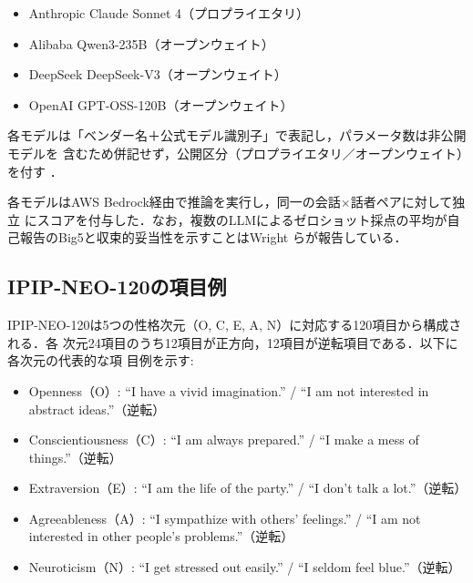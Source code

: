 \documentclass[dvipdfmx,11pt,a4paper]{bxjsarticle}
\renewcommand{\_}{\paperorigunderscore\allowbreak}%
\begin{document}

\begin{itemize}
  \item Anthropic Claude Sonnet 4（プロプライエタリ）
  \item Alibaba Qwen3-235B（オープンウェイト）
  \item DeepSeek DeepSeek-V3（オープンウェイト）
  \item OpenAI GPT-OSS-120B（オープンウェイト）
\end{itemize}

各モデルは「ベンダー名＋公式モデル識別子」で表記し，パラメータ数は非公開モデルを
含むため併記せず，公開区分（プロプライエタリ／オープンウェイト）を付す
\cite{wright2026}．

各モデルはAWS Bedrock経由で推論を実行し，同一の会話$\times$話者ペアに対して独立
にスコアを付与した．なお，複数のLLMによるゼロショット採点の平均が自
己報告のBig5と収束的妥当性を示すことはWright ら\cite{wright2026}が報告している．


\subsection{IPIP-NEO-120の項目例}
\label{sec:appendix_ipip}

IPIP-NEO-120は5つの性格次元（O, C, E, A, N）に対応する120項目から構成される．各
次元24項目のうち12項目が正方向，12項目が逆転項目である．以下に各次元の代表的な項
目例を示す:

\begin{itemize}
  \item Openness（O）: ``I have a vivid imagination.'' / ``I am not interested in abstract ideas.''（逆転）
  \item Conscientiousness（C）: ``I am always prepared.'' / ``I make a mess of things.''（逆転）
  \item Extraversion（E）: ``I am the life of the party.'' / ``I don't talk a lot.''（逆転）
  \item Agreeableness（A）: ``I sympathize with others' feelings.'' / ``I am not interested in other people's problems.''（逆転）
  \item Neuroticism（N）: ``I get stressed out easily.'' / ``I seldom feel blue.''（逆転）
\end{itemize}
\end{document}
